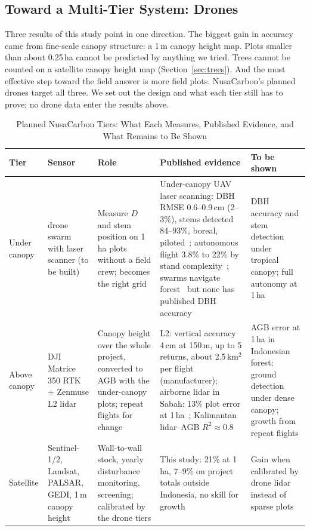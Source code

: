 \documentclass[conference,a4paper]{IEEEtran}
\begin{document}
\subsection{Toward a Multi-Tier System: Drones}
\label{sec:drones}
Three results of this study point in one direction. The biggest gain in accuracy came from fine-scale canopy structure: a 1\,m canopy height map. Plots smaller than about 0.25\,ha cannot be predicted by anything we tried. Trees cannot be counted on a satellite canopy height map (Section~\ref{sec:trees}). And the most effective step toward the field answer is more field plots. NusaCarbon's planned drones target all three. We set out the design and what each tier still has to prove; no drone data enter the results above.

\begin{table}[t]
\centering
\caption{Planned NusaCarbon Tiers: What Each Measures, Published Evidence, and What Remains to Be Shown}
\label{tab:tiers}
\footnotesize
\setlength{\tabcolsep}{4pt}
\begin{tabularx}{\textwidth}{@{}>{\raggedright\arraybackslash}p{1.6cm} >{\raggedright\arraybackslash}p{2.5cm} >{\raggedright\arraybackslash}X >{\raggedright\arraybackslash}X >{\raggedright\arraybackslash}X@{}}
\toprule
\textbf{Tier} & \textbf{Sensor} & \textbf{Role} & \textbf{Published evidence} & \textbf{To be shown}\\
\midrule
Under canopy & drone swarm with laser scanner (to be built) & Measure $D$ and stem position on 1\,ha plots without a field crew; becomes the right grid & Under-canopy UAV laser scanning: DBH RMSE 0.6--0.9\,cm (2--3\%), stems detected 84--93\%, boreal, piloted~\cite{hyyppa2020under}; autonomous flight 3.8\% to 22\% by stand complexity~\cite{liang2024forest}; swarms navigate forest~\cite{zhou2022swarm} but none has published DBH accuracy & DBH accuracy and stem detection under tropical canopy; full autonomy at 1\,ha\\
Above canopy & DJI Matrice 350 RTK + Zenmuse L2 lidar & Canopy height over the whole project, converted to AGB with the under-canopy plots; repeat flights for change & L2: vertical accuracy 4\,cm at 150\,m, up to 5 returns, about 2.5\,km$^2$ per flight (manufacturer); airborne lidar in Sabah: 13\% plot error at 1\,ha~\cite{jucker2018estimating}; Kalimantan lidar--AGB $R^2\approx0.8$~\cite{ferraz2018carbon} & AGB error at 1\,ha in Indonesian forest; ground detection under dense canopy; growth from repeat flights\\
Satellite & Sentinel-1/2, Landsat, PALSAR, GEDI, 1\,m canopy height & Wall-to-wall stock, yearly disturbance monitoring, screening; calibrated by the drone tiers & This study: 21\% at 1\,ha, 7--9\% on project totals outside Indonesia, no skill for growth & Gain when calibrated by drone lidar instead of sparse plots\\
\bottomrule
\end{tabularx}
\end{table}
\end{document}
